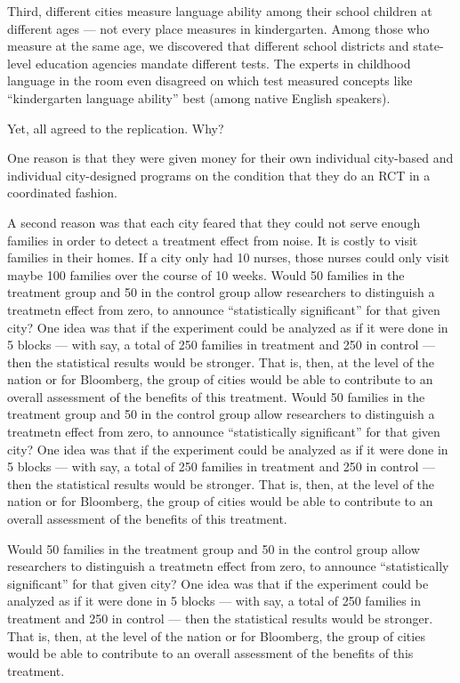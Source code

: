 \documentclass[
]{article}
\begin{document}
Third, different cities measure language ability among their school
children at different ages --- not every place measures in kindergarten.
Among those who measure at the same age, we discovered that different
school districts and state-level education agencies mandate different
tests. The experts in childhood language in the room even disagreed on
which test measured concepts like ``kindergarten language ability'' best
(among native English speakers).

Yet, all agreed to the replication. Why?

One reason is that they were given money for their own individual
city-based and individual city-designed programs on the condition that
they do an RCT in a coordinated fashion.

A second reason was that each city feared that they could not serve
enough families in order to detect a treatment effect from noise. It is
costly to visit families in their homes. If a city only had 10 nurses,
those nurses could only visit maybe 100 families over the course of 10
weeks. Would 50 families in the treatment group and 50 in the control
group allow researchers to distinguish a treatmetn effect from zero, to
announce ``statistically significant'' for that given city? One idea was
that if the experiment could be analyzed as if it were done in 5 blocks
--- with say, a total of 250 families in treatment and 250 in control
--- then the statistical results would be stronger. That is, then, at
the level of the nation or for Bloomberg, the group of cities would be
able to contribute to an overall assessment of the benefits of this
treatment. Would 50 families in the treatment group and 50 in the
control group allow researchers to distinguish a treatmetn effect from
zero, to announce ``statistically significant'' for that given city? One
idea was that if the experiment could be analyzed as if it were done in
5 blocks --- with say, a total of 250 families in treatment and 250 in
control --- then the statistical results would be stronger. That is,
then, at the level of the nation or for Bloomberg, the group of cities
would be able to contribute to an overall assessment of the benefits of
this treatment.

Would 50 families in the treatment group and 50 in the control group
allow researchers to distinguish a treatmetn effect from zero, to
announce ``statistically significant'' for that given city? One idea was
that if the experiment could be analyzed as if it were done in 5 blocks
--- with say, a total of 250 families in treatment and 250 in control
--- then the statistical results would be stronger. That is, then, at
the level of the nation or for Bloomberg, the group of cities would be
able to contribute to an overall assessment of the benefits of this
treatment.
\end{document}
